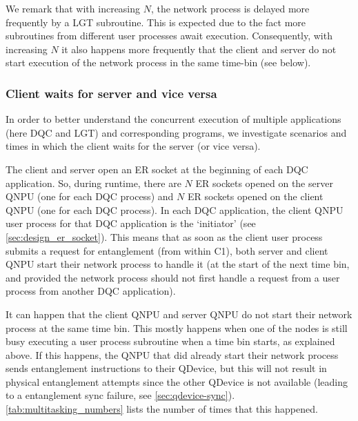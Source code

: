 We remark that with increasing $N$, the network process is delayed more frequently by a \ac{LGT} subroutine. This is expected due to the fact more subroutines from different user processes await execution. Consequently, with increasing $N$ it also happens more frequently that the client and server do not start execution of the network process in the same time-bin (see below).

\subsubsection{Client waits for server and vice versa}

In order to better understand the concurrent execution of multiple applications (here \ac{DQC} and \ac{LGT}) and corresponding programs, we investigate scenarios and times in which the client waits for the server (or vice versa). 

The client and server open an \ac{ER} socket at the beginning of each \ac{DQC} application. So, during runtime, there are $N$ \ac{ER} sockets opened on the server \ac{QNPU} (one for each \ac{DQC} process) and $N$ \ac{ER} sockets opened on the client \ac{QNPU} (one for each \ac{DQC} process). In each \ac{DQC} application, the client \ac{QNPU} user process for that \ac{DQC} application is the `initiator' (see \cref{sec:design_er_socket}). This means that as soon as the client user process submits a request for entanglement (from within C1), both server and client \ac{QNPU} start their network process to handle it (at the start of the next time bin, and provided the network process should not first handle a request from a user process from another \ac{DQC} application).

It can happen that the client \ac{QNPU} and server \ac{QNPU} do not start their network process at the same time bin. This mostly happens when one of the nodes is still busy executing a user process subroutine when a time bin starts, as explained above. If this happens, the \ac{QNPU} that did already start their network process sends entanglement instructions to their \ac{QDevice}, but this will not result in physical entanglement attempts since the other \ac{QDevice} is not available (leading to a entanglement sync failure, see \cref{sec:qdevice-sync}). \cref{tab:multitasking_numbers} lists the number of times that this happened.

